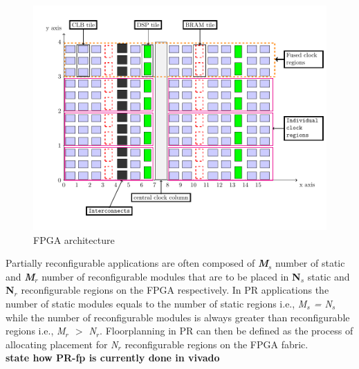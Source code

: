 \begin{figure}
  \includegraphics[width=\linewidth]{graphics/fpga.png}
  \caption{FPGA architecture}
  \label{fig:fpga}
\end{figure}

Partially reconfigurable applications are often composed of \textbf{\textit{M$_s$}} number of static and \textbf{\textit{M$_r$}} number of reconfigurable modules that are to be placed in \textbf{N$_s$} static and \textbf{N$_r$} reconfigurable regions on the FPGA respectively.  In PR applications the number of static modules equals to the number of static regions i.e., \textit{M$_s$ = N$_s$} while the number of reconfigurable modules is always greater than reconfigurable regions i.e., \textit{M$_r$ $>$ N$_r$}. Floorplanning in PR can then be defined as the process of allocating placement for \textit{N$_r$} reconfigurable regions on the FPGA fabric. \\

\textbf{state how PR-fp is currently done in vivado} \\


